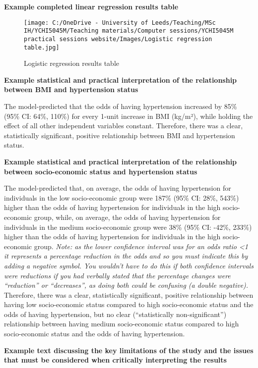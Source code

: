 \documentclass[
]{book}
\begin{document}
\textbf{Example completed linear regression results table}

\begin{figure}
\centering
\texttt{[image: C:/OneDrive - University of Leeds/Teaching/MSc IH/YCHI5045M/Teaching materials/Computer sessions/YCHI5045M practical sessions website/Images/Logistic regression table.jpg]}
\caption{Logistic regression results table}
\end{figure}

\textbf{Example statistical and practical interpretation of the relationship between BMI and hypertension status}

The model-predicted that the odds of having hypertension increased by 85\% (95\% CI: 64\%, 110\%) for every 1-unit increase in BMI (kg/m²), while holding the effect of all other independent variables constant. Therefore, there was a clear, statistically significant, positive relationship between BMI and hypertension status.

\textbf{Example statistical and practical interpretation of the relationship between socio-economic status and hypertension status}

The model-predicted that, on average, the odds of having hypertension for individuals in the low socio-economic group were 187\% (95\% CI: 28\%, 543\%) higher than the odds of having hypertension for individuals in the high socio-economic group, while, on average, the odds of having hypertension for individuals in the medium socio-economic group were 38\% (95\% CI: -42\%, 233\%) higher than the odds of having hypertension for individuals in the high socio-economic group. \emph{Note: as the lower confidence interval was for an odds ratio \textless1 it represents a percentage reduction in the odds and so you must indicate this by adding a negative symbol. You wouldn't have to do this if both confidence intervals were reductions if you had verbally stated that the percentage changes were ``reduction'' or ``decreases'', as doing both could be confusing (a double negative).} Therefore, there was a clear, statistically significant, positive relationship between having low socio-economic status compared to high socio-economic status and the odds of having hypertension, but no clear (``statistically non-significant'') relationship between having medium socio-economic status compared to high socio-economic status and the odds of having hypertension.

\textbf{Example text discussing the key limitations of the study and the issues that must be considered when critically interpreting the results}
\end{document}
